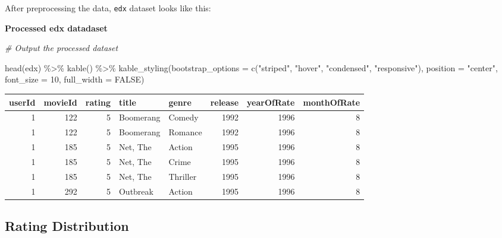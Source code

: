 \documentclass[
]{article}
\newenvironment{Shaded}{}{}
\newcommand{\AttributeTok}[1]{\textcolor[rgb]{0.49,0.56,0.16}{#1}}
\newcommand{\CommentTok}[1]{\textcolor[rgb]{0.38,0.63,0.69}{\textit{#1}}}
\newcommand{\ConstantTok}[1]{\textcolor[rgb]{0.53,0.00,0.00}{#1}}
\newcommand{\DecValTok}[1]{\textcolor[rgb]{0.25,0.63,0.44}{#1}}
\newcommand{\FunctionTok}[1]{\textcolor[rgb]{0.02,0.16,0.49}{#1}}
\newcommand{\NormalTok}[1]{#1}
\newcommand{\SpecialCharTok}[1]{\textcolor[rgb]{0.25,0.44,0.63}{#1}}
\newcommand{\StringTok}[1]{\textcolor[rgb]{0.25,0.44,0.63}{#1}}
\begin{document}
After preprocessing the data, \texttt{edx} dataset looks like this:

\textbf{Processed edx datadaset}

\begin{Shaded}
\begin{Highlighting}[]
\CommentTok{\# Output the processed dataset}

\FunctionTok{head}\NormalTok{(edx) }\SpecialCharTok{\%\textgreater{}\%}
   \FunctionTok{kable}\NormalTok{() }\SpecialCharTok{\%\textgreater{}\%}
   \FunctionTok{kable\_styling}\NormalTok{(}\AttributeTok{bootstrap\_options =} \FunctionTok{c}\NormalTok{(}\StringTok{"striped"}\NormalTok{, }\StringTok{"hover"}\NormalTok{, }\StringTok{"condensed"}\NormalTok{, }\StringTok{"responsive"}\NormalTok{),}
                 \AttributeTok{position =} \StringTok{"center"}\NormalTok{,}
                 \AttributeTok{font\_size =} \DecValTok{10}\NormalTok{,}
                 \AttributeTok{full\_width =} \ConstantTok{FALSE}\NormalTok{)}
\end{Highlighting}
\end{Shaded}

\begin{table}
\centering\begingroup\fontsize{10}{12}\selectfont

\begin{tabular}{r|r|r|l|l|r|r|r}
\hline
userId & movieId & rating & title & genre & release & yearOfRate & monthOfRate\\
\hline
1 & 122 & 5 & Boomerang & Comedy & 1992 & 1996 & 8\\
\hline
1 & 122 & 5 & Boomerang & Romance & 1992 & 1996 & 8\\
\hline
1 & 185 & 5 & Net, The & Action & 1995 & 1996 & 8\\
\hline
1 & 185 & 5 & Net, The & Crime & 1995 & 1996 & 8\\
\hline
1 & 185 & 5 & Net, The & Thriller & 1995 & 1996 & 8\\
\hline
1 & 292 & 5 & Outbreak & Action & 1995 & 1996 & 8\\
\hline
\end{tabular}
\endgroup{}
\end{table}

\newpage

\hypertarget{rating-distribution}{%
\subsection{Rating Distribution}\label{rating-distribution}}
\end{document}
